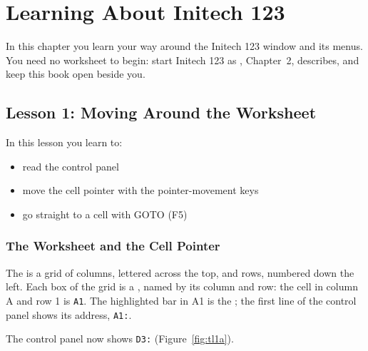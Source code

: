 \chapter{Learning About Initech 123}

In this chapter you learn your way around the Initech 123 window and its
menus.  You need no worksheet to begin: start Initech 123 as
, Chapter~2, describes, and keep this
book open beside you.

\section{Lesson 1: Moving Around the Worksheet}
In this lesson you learn to:
\begin{itemize}
\item read the control panel
\item move the cell pointer with the pointer-movement keys
\item go straight to a cell with GOTO (F5)
\end{itemize}

\subsection{The Worksheet and the Cell Pointer}
The  is a grid of columns, lettered across the top, and
rows, numbered down the left.  Each box of the grid is a
, named by its column and row: the cell in column A and row 1
is \texttt{A1}.  The highlighted bar in A1 is the ; the
first line of the control panel shows its address, \texttt{A1:}.

\begin{Keystrokes}
\end{Keystrokes}
The control panel now shows \texttt{D3:} (Figure~\ref{fig:tl1a}).

